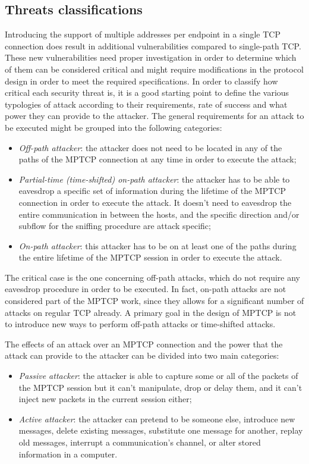 \subsection{Threats classifications}
Introducing the support of multiple addresses per endpoint in a single TCP connection does result in additional vulnerabilities compared to single-path TCP. These new vulnerabilities need proper investigation in order to determine which of them can be considered critical and might require modifications in the protocol design in order to meet the required specifications. In order to classify how critical each security threat is, it is a good starting point to define the various typologies of attack according to their requirements, rate of success and what power they can provide to the attacker.
The general requirements for an attack to be executed might be grouped into the following categories:

\begin{itemize}  
\item \textit{Off-path attacker}: the attacker does not need to be located in any of the paths of the MPTCP connection at any time in order to execute the attack;
\item \textit{Partial-time (time-shifted) on-path attacker}: the attacker has to be able to eavesdrop a specific set of information during the lifetime of the MPTCP connection in order to execute the attack. It doesn't need to eavesdrop the entire communication in between the hosts, and the specific direction and/or subflow for the sniffing procedure are attack specific;
\item \textit{On-path attacker}: this attacker has to be on at least one of the paths during the entire lifetime of the MPTCP session in order to execute the attack.
\end{itemize}

The critical case is the one concerning off-path attacks, which do not require any eavesdrop procedure in order to be executed. In fact, on-path attacks are not considered part of the MPTCP work, since they allows for a significant number of attacks on regular TCP already. A primary goal in the design of MPTCP is not to introduce new ways to perform off-path attacks or time-shifted attacks.

The effects of an attack over an MPTCP connection and the power that the attack can provide to the attacker can be divided into two main categories:

\begin{itemize}  
\item \textit{Passive attacker}: the attacker is able to capture some or all of the packets of the MPTCP session but it can't manipulate, drop or delay them, and it can't inject new packets in the current session either;
\item \textit{Active attacker}: the attacker can pretend to be someone else, introduce new messages, delete existing messages, substitute one message for another, replay old messages, interrupt a communication's channel, or alter stored information in a computer.
\end{itemize}

